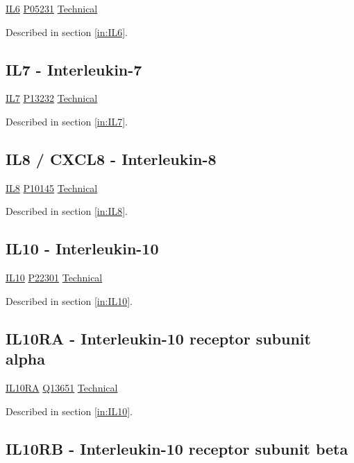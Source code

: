 \href{https://en.wikipedia.org/wiki/Interleukin\_6}{IL6}
\href{http://www.uniprot.org/uniprot/P05231}{P05231}
\href{https://olink.com/products-services/target/protein/?assayID=5073}{Technical}

Described in section \ref{in:IL6}.

\subsection{IL7 - Interleukin-7}

\href{https://en.wikipedia.org/wiki/Interleukin\_7}{IL7}
\href{http://www.uniprot.org/uniprot/P13232}{P13232}
\href{https://olink.com/products-services/target/protein/?assayID=5069}{Technical}

Described in section \ref{in:IL7}.

\subsection{IL8 / CXCL8 - Interleukin-8}

\href{https://en.wikipedia.org/wiki/Interleukin\_8}{IL8}
\href{http://www.uniprot.org/uniprot/P10145}{P10145}
\href{https://olink.com/products-services/target/protein/?assayID=5087}{Technical}

Described in section \ref{in:IL8}.

\subsection{IL10 - Interleukin-10}

\href{https://en.wikipedia.org/wiki/Interleukin\_10}{IL10}
\href{http://www.uniprot.org/uniprot/P22301}{P22301}
\href{https://olink.com/products-services/target/protein/?assayID=5100}{Technical}

Described in section \ref{in:IL10}.

\subsection{IL10RA - Interleukin-10 receptor subunit alpha}

\href{https://en.wikipedia.org/wiki/Interleukin_10_receptor,_alpha_subunit}{IL10RA}
\href{http://www.uniprot.org/uniprot/Q13651}{Q13651}
\href{https://olink.com/products-services/target/protein/?assayID=5047}{Technical}

Described in section \ref{in:IL10}.

\subsection{IL10RB - Interleukin-10 receptor subunit beta}

